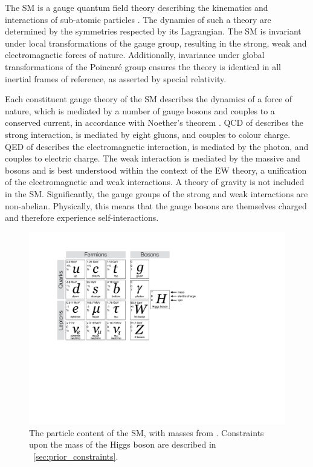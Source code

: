
The \ac{SM} is a gauge quantum field theory describing the kinematics and interactions of 
sub-atomic particles 
\cite{Aitchison,Peskin,Glashow:1961,Weinberg:1967,Salam:1968,'tHooft:1972}. 
The dynamics of such a theory are determined 
by the symmetries respected by its Lagrangian. The \ac{SM} is invariant under local 
transformations of the \SMgroup gauge group, resulting in the strong, weak and 
electromagnetic forces of nature. Additionally, invariance under global transformations of 
the Poincaré group ensures the theory is identical in all inertial frames of reference, as 
asserted by special relativity.

Each constituent gauge theory of the \ac{SM} describes the dynamics of a force of nature, 
which is mediated by a number of gauge bosons and couples to a conserved current, in 
accordance with Noether's theorem \cite{Noether:1918}. \ac{QCD} of  describes 
the strong interaction, is mediated by eight gluons, and couples to colour charge. \ac{QED}
of  describes the electromagnetic interaction, is mediated by the 
photon, and couples to electric charge. The weak interaction is mediated by the massive 
\PWpm and \PZ bosons and is best understood within the context of the \ac{EW} theory,
a unification of the electromagnetic and weak interactions. A theory of
gravity is not included in the \ac{SM}. Significantly, the gauge groups of 
the strong and weak interactions are non-abelian. Physically, this means that the
gauge bosons are themselves charged and therefore experience self-interactions.

\begin{figure}
	\includegraphics[width=\largefigwidth,clip=true,trim=3.9cm 11.8cm 12.6cm 2.6cm]{custom_images/sm_particles}
	\caption{The particle content of the \ac{SM}, with masses from \cite{PDG:2012}. 
	Constraints upon the mass of the Higgs boson are described in 
	\Section~\ref{sec:prior_constraints}.}
	\label{fig:sm_particles}
\end{figure}


